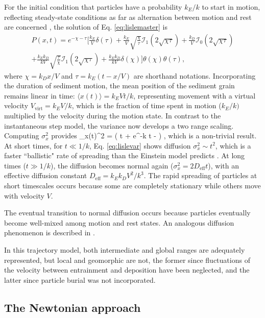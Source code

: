 For the initial condition that particles have a probability $k_E/k$ to start in motion, reflecting steady-state conditions as far as alternation between motion and rest are concerned \citep[e.g.][]{Ancey2006}, the solution of Eq. \ref{eq:lislemaster} is \citep{Lisle1998}
\begin{multline}  P(x,t) =  e^{-\chi-\tau} \Big[ \frac{k_E}{V}\delta(\tau) + \frac{k_E}{V} \sqrt{\frac{\chi}{\tau}}\mathcal{I}_1(2\sqrt{\chi\tau}) + \frac{k_D}{V}\mathcal{I}_0(2\sqrt{\chi\tau}) \\
	+ \frac{k_Ek_D}{kV}\sqrt{\frac{\tau}{\chi}}\mathcal{I}_1(2\sqrt{\chi\tau}) + \frac{k_Ek_D}{kV} \delta(\chi)
	\Big]\theta(\chi)\theta(\tau), \label{eq:lisledist}
\end{multline}
where $\chi = k_D x/V$ and $\tau = k_E(t-x/V)$ are shorthand notations.
Incorporating the duration of sediment motion, the mean position of the sediment grain remains linear in time: $\langle x (t) \rangle  = k_E V t/k$, representing movement with a virtual velocity $V_\text{virt} = k_E V/k$, which is the fraction of time spent in motion ($k_E/k)$ \citep{Ancey2006} multiplied by the velocity during the motion state. In contrast to the instantaneous step model, the variance now develops a two range scaling.
Computing $\sigma_x^2$ provides
\be \sigma_x(t)^2 = \Big( t + e^{-k t} - \Big) , \label{eq:lislevar}\ee
which is a non-trivial result. At short times, for $t\ll 1/k$, Eq. \ref{eq:lislevar} shows diffusion $\sigma_x^2 \sim t^2$, which is a faster ``ballistic" rate of spreading than the Einstein model predicts \citep{Sokolov2012}. At long times ($t\gg 1/k$), the diffusion becomes normal again ($\sigma_x^2 = 2 D_\text{eff} t$), with an effective diffusion constant $ D_\text{eff} = k_E k_D V^2/k^3$. 
The rapid spreading of particles at short timescales occurs because some are completely stationary while others move with velocity $V$.

The eventual transition to normal diffusion occurs because particles eventually become well-mixed among motion and rest states. An analogous diffusion phenomenon is described in \citet{Taylor1920}.

In this trajectory model, both intermediate and global ranges are adequately represented, but local and geomorphic are not, the former since fluctuations of the velocity between entrainment and deposition have been neglected, and the latter since particle burial was not incorporated.

\subsection{The Newtonian approach}

